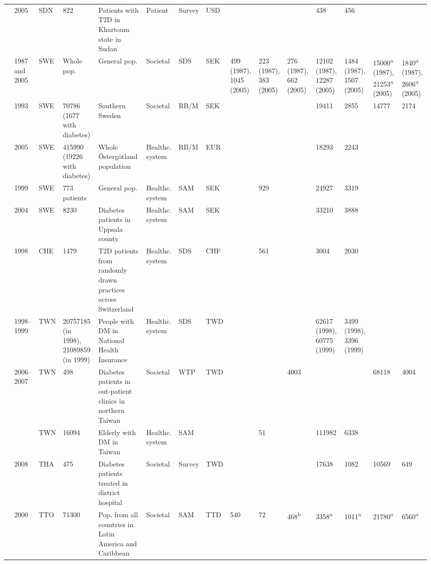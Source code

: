 {\begin{landscape}
\begin{tabularx}{\linewidth}{Z X X Z Z X X X X X X X X Y Y}
\textcite{Elrayah-Eliadarous2010b} & 2005 & SDN & 822 & Patients with T2D in Khartoum state in   Sudan & Patient & Survey & USD &  &  &  & 438 & 456 &  &  \\
\textcite{Bolin2009d}  & 1987 and 2005 & SWE & Whole pop. & General pop. & Societal & SDS & SEK & 499 (1987), 1045 (2005) & 223 (1987), 383 (2005) & 276 (1987), 662 (2005) & 12102 (1987), 12287 (2005) & 1484 (1987), 1507 (2005) & 15000\textsuperscript{a}    (1987), 21253\textsuperscript{a}  (2005) & 1840\textsuperscript{a}    (1987), 2606\textsuperscript{a}  (2005) \\
\textcite{Norlund2001a} & 1993 & SWE & 70786 (1677 with diabetes) & Southern Sweden & Societal & RB/M & SEK &  &  &  & 19411 & 2855 & 14777 & 2174 \\
\textcite{Wirehn2008b} & 2005 & SWE & 415990 (19226 with diabetes) & Whole \"Osterg\"otland population & Healthc. system & RB/M & EUR &  &  &  & 18293 & 2243 &  &  \\
\textcite{Jonsson2002b} & 1999 & SWE & 773 patients & General pop. & Healthc. system & SAM & SEK &  & 929 &  & 24927 & 3319 &  &  \\
\textcite{Ringborg2008a} & 2004 & SWE & 8230 & Diabetes patients in Uppsala county & Healthc. system & SAM & SEK &  &  &  & 33210 & 3888 &  &  \\
\textcite{Schmitt-Koopmann2004b} & 1998 & CHE & 1479 & T2D patients from randomly drawn practices   across Switzerland & Healthc. system & SDS & CHF &  & 561 &  & 3004 & 2030 &  &  \\
\textcite{Lin2004} & 1998--1999 & TWN & 20757185 (in 1998), 21089859 (in 1999) & People with DM in National Health Insurance & Healthc. system & SDS & TWD &  &  &  & 62617 (1998), 60775 (1999) & 3499 (1998), 3396 (1999) &  &  \\
\textcite{Chang2010b} & 2006--2007 & TWN & 498 & Diabetes patients in out-patient clinics in   northern Taiwan & Societal & \ac{WTP} & TWD &  &  & 4003 &  &  & 68118 & 4004 \\
\textcite{Chi2011a} &  & TWN & 16094 & Elderly with DM in Taiwan & Healthc. system & SAM &  &  & 51 &  & 111982 & 6338 &  &  \\
\textcite{Chatterjee2011c} & 2008 & THA & 475 & Diabetes patients treated in district hospital & Societal & Survey & TWD &  &  &  & 17638 & 1082 & 10569 & 649 \\
\textcite{Barcelo2003} & 2000 & TTO & 71300 & Pop. from all countries in Latin America   and Caribbean & Societal & SAM & TTD & 540 & 72 & 468\textsuperscript{b} & 3358\textsuperscript{a} & 1011\textsuperscript{a} & 21780\textsuperscript{a} & 6560\textsuperscript{a} \\

\end{tabularx}
\end{landscape}}
